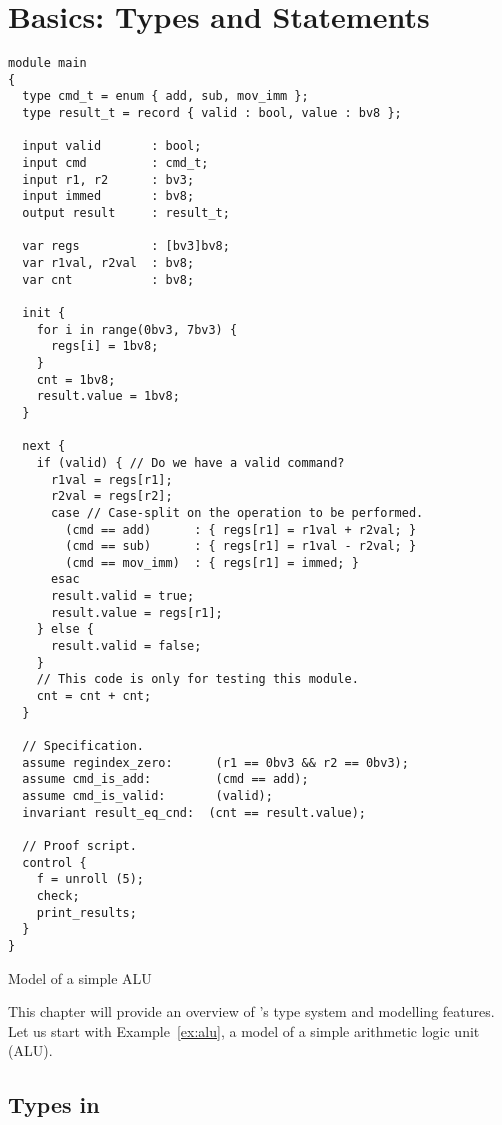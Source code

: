 \chapter{Basics: Types and Statements}
\begin{uclidlisting}[htbp]
\begin{lstlisting}[language=uclid,style=uclidstyle]
module main
{
  type cmd_t = enum { add, sub, mov_imm };
  type result_t = record { valid : bool, value : bv8 };

  input valid       : bool;
  input cmd         : cmd_t;
  input r1, r2      : bv3;
  input immed       : bv8;
  output result     : result_t;

  var regs          : [bv3]bv8;
  var r1val, r2val  : bv8;
  var cnt           : bv8; 

  init {
    for i in range(0bv3, 7bv3) {
      regs[i] = 1bv8;
    }
    cnt = 1bv8;
    result.value = 1bv8;
  }

  next {
    if (valid) { // Do we have a valid command?
      r1val = regs[r1];
      r2val = regs[r2];
      case // Case-split on the operation to be performed.
        (cmd == add)      : { regs[r1] = r1val + r2val; }
        (cmd == sub)      : { regs[r1] = r1val - r2val; }
        (cmd == mov_imm)  : { regs[r1] = immed; }
      esac
      result.valid = true;
      result.value = regs[r1];
    } else {
      result.valid = false;
    }
    // This code is only for testing this module.
    cnt = cnt + cnt;
  }

  // Specification.
  assume regindex_zero:      (r1 == 0bv3 && r2 == 0bv3);
  assume cmd_is_add:         (cmd == add);
  assume cmd_is_valid:       (valid);
  invariant result_eq_cnd:  (cnt == result.value);

  // Proof script.
  control {
    f = unroll (5);
    check;
    print_results;
  }
}
\end{lstlisting}
\caption{Model of a simple ALU}
\label{ex:alu}
\end{uclidlisting}

This chapter will provide an overview of \uclid{}'s type system and modelling features. Let us start with Example~\ref{ex:alu}, a model of a simple arithmetic logic unit (ALU). 

\section{Types in \uclid{}}

